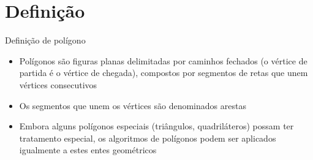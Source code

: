 \section{Definição}

\begin{frame}[fragile]{Definição de polígono}

    \begin{itemize}
        \item Polígonos são figuras planas delimitadas por caminhos fechados 
            (o vértice de partida é o vértice de chegada), compostos por segmentos de retas que 
            unem vértices consecutivos
        \pause

        \item Os segmentos que unem os vértices são denominados arestas
        \pause

        \item Embora alguns polígonos especiais (triângulos, quadriláteros) possam ter tratamento
            especial, os algoritmos de polígonos podem ser aplicados igualmente a estes entes
            geométricos
        \pause
    \end{itemize}

    \begin{figure}
        \centering

    \end{figure}

\end{frame}

